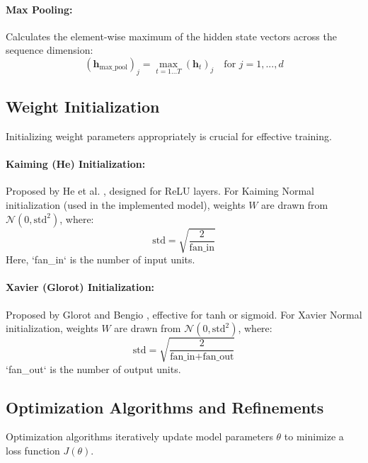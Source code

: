 \begin{appendices}
  \paragraph{Max Pooling:}
  Calculates the element-wise maximum of the hidden state vectors across the sequence dimension:
  \begin{equation}
    (\bm{h}_{\text{max\_pool}})_j = \max_{t=1...T} (\bm{h}_t)_j \quad \text{for } j = 1, ..., d
  \end{equation}

  \subsection{Weight Initialization}
  Initializing weight parameters appropriately is crucial for effective training.

  \paragraph{Kaiming (He) Initialization:}
  Proposed by He et al. \autocite{he2015delving}, designed for ReLU layers. For Kaiming Normal initialization (used in the implemented model), weights \( W \) are drawn from \( \mathcal{N}(0, \text{std}^2) \), where:
  \begin{equation}
    \text{std} = \sqrt{\frac{2}{\text{fan\_in}}}
  \end{equation}
  Here, `fan_in` is the number of input units.

  \paragraph{Xavier (Glorot) Initialization:}
  Proposed by Glorot and Bengio \autocite{glorot2010understanding}, effective for tanh or sigmoid. For Xavier Normal initialization, weights \( W \) are drawn from \( \mathcal{N}(0, \text{std}^2) \), where:
  \begin{equation}
    \text{std} = \sqrt{\frac{2}{\text{fan\_in} + \text{fan\_out}}}
  \end{equation}
  `fan_out` is the number of output units.

  \subsection{Optimization Algorithms and Refinements}
  Optimization algorithms iteratively update model parameters \( \theta \) to minimize a loss function \( J(\theta) \).


\end{appendices}

